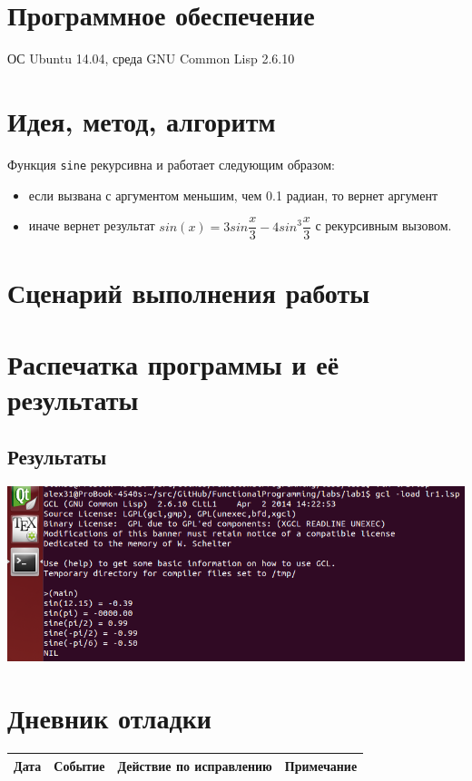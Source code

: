 \documentclass[12pt]{article}
\begin{document}
\section{Программное обеспечение}
ОС Ubuntu 14.04, среда GNU Common Lisp 2.6.10

\section{Идея, метод, алгоритм}
Функция {\tt sine} рекурсивна и работает следующим образом:
\begin{itemize}
\setlength{\itemsep}{-1mm} %
\item если вызвана с аргументом меньшим, чем 0.1 радиан, то вернет аргумент
\item иначе вернет результат $sin(x) = 3sin\dfrac{x}{3} - 4sin^3\dfrac{x}{3}$ с рекурсивным вызовом.
\end{itemize}

\section{Сценарий выполнения работы}
\section{Распечатка программы и её результаты}

\subsection{Результаты}
\includegraphics[scale=0.7]{lr1Screen}

%

\section{Дневник отладки}
\begin{tabular}{|c|c|c|c|}
\hline
Дата & Событие & Действие по исправлению & Примечание \\
\hline
\end{tabular}
\end{document}
